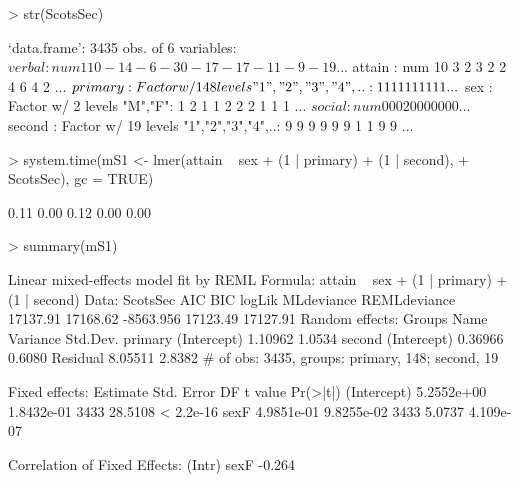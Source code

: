\documentclass[12pt]{article}
\begin{document}
\begin{Schunk}
\begin{Sinput}
> str(ScotsSec)
\end{Sinput}
\begin{Soutput}
`data.frame':	3435 obs. of  6 variables:
 $ verbal : num  11 0 -14 -6 -30 -17 -17 -11 -9 -19 ...
 $ attain : num  10 3 2 3 2 2 4 6 4 2 ...
 $ primary: Factor w/ 148 levels "1","2","3","4",..: 1 1 1 1 1 1 1 1 1 1 ...
 $ sex    : Factor w/ 2 levels "M","F": 1 2 1 1 2 2 2 1 1 1 ...
 $ social : num  0 0 0 20 0 0 0 0 0 0 ...
 $ second : Factor w/ 19 levels "1","2","3","4",..: 9 9 9 9 9 9 1 1 9 9 ...
\end{Soutput}
\begin{Sinput}
> system.time(mS1 <- lmer(attain ~ sex + (1 | primary) + (1 | second), 
+     ScotsSec), gc = TRUE)
\end{Sinput}
\begin{Soutput}
[1] 0.11 0.00 0.12 0.00 0.00
\end{Soutput}
\begin{Sinput}
> summary(mS1)
\end{Sinput}
\begin{Soutput}
Linear mixed-effects model fit by REML
Formula: attain ~ sex + (1 | primary) + (1 | second) 
   Data: ScotsSec 
      AIC      BIC    logLik MLdeviance REMLdeviance
 17137.91 17168.62 -8563.956   17123.49     17127.91
Random effects:
 Groups   Name        Variance Std.Dev.
 primary  (Intercept) 1.10962  1.0534  
 second   (Intercept) 0.36966  0.6080  
 Residual             8.05511  2.8382  
# of obs: 3435, groups: primary, 148; second, 19

Fixed effects:
              Estimate Std. Error   DF t value  Pr(>|t|)
(Intercept) 5.2552e+00 1.8432e-01 3433 28.5108 < 2.2e-16
sexF        4.9851e-01 9.8255e-02 3433  5.0737 4.109e-07

Correlation of Fixed Effects:
     (Intr)
sexF -0.264
\end{Soutput}
\end{Schunk}


\end{document}
